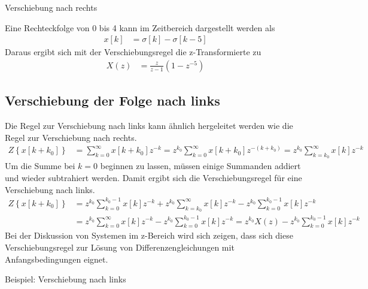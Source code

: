 \begin{example}{Verschiebung nach rechts}
\label{example:beispiel-verschiebung-nach-rechts}

Eine Rechteckfolge von 0 bis 4 kann im Zeitbereich dargestellt werden als
\begin{align*}
x[ k] &= \sigma[ k] - \sigma[ k - 5] 
\end{align*}
Daraus ergibt sich mit der Verschiebungsregel die z-Transformierte zu
\begin{align*}
X(z) &= \frac{z}{z - 1}  \left( 1 - z^{- 5} \right) 
\end{align*}
\end{example}

\subsection{Verschiebung der Folge nach links}\label{sec:verschiebung-der-folge-nach-links}

Die Regel zur Verschiebung nach links kann ähnlich hergeleitet werden wie die Regel zur Verschiebung nach rechts.
\begin{align}
Z\left\{ x[ k + k_{0}] \right\} &= \sum\limits_{k = 0}^{\infty}{x[ k + k_{0}]  z^{- k}} = z^{k_{0}}  \sum\limits_{k = 0}^{\infty}{x[ k + k_{0}]  z^{- (k + k_{0})}} = z^{k_{0}}  \sum\limits_{k = k_{0}}^{\infty}{x[ k]  z^{- k}} \label{eq:5.44}
\end{align}
Um die Summe bei \(k = 0\) beginnen zu lassen, müssen einige Summanden addiert und wieder subtrahiert werden. Damit ergibt sich die Verschiebungsregel für eine Verschiebung nach links.
\begin{align}
{\boldsymbol{\mathit{Z}}\left\{x\left[k+k_{0} \right]\right\}} &=  {z^{k_{0} }  \sum\limits _{k=0}^{k_{0} -1}x\left[k\right] z^{-k}  +z^{k_{0} }  \sum\limits _{k=k_{0} }^{\infty }x\left[k\right] z^{-k}  -z^{k_{0} }  \sum\limits _{k=0}^{k_{0} -1}x\left[k\right] z^{-k}  } \\
{} &=  {z^{k_{0} }  \sum\limits _{k=0}^{\infty }x\left[k\right] z^{-k}  -z^{k_{0} }  \sum\limits _{k=0}^{k_{0} -1}x\left[k\right] z^{-k}  =z^{k_{0} }  X\left(z\right)-z^{k_{0} }  \sum\limits _{k=0}^{k_{0} -1}x\left[k\right] z^{-k}  }
\label{eq:5.45}
\end{align}
Bei der Diskussion von Systemen im z-Bereich wird sich zeigen, dass sich diese Verschiebungsregel zur Lösung von Differenzengleichungen mit Anfangsbedingungen eignet.

Beispiel: Verschiebung nach links

